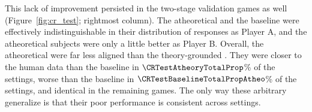 This lack of improvement persisted in the two-stage validation games as well (Figure~\ref{fig:cr_test}; rightmost column).  
The atheoretical  and the baseline were effectively indistinguishable in their distribution of responses as Player A, and the atheoretical subjects were only a little better as Player B.
Overall, the atheoretical  were far less aligned than the theory-grounded . 
They were closer to the human data than the baseline in $\CRTestAtheoryTotalProp$\% of the settings, worse than the baseline in $\CRTestBaselineTotalPropAtheo$\% of the settings, and identical in the remaining games.
The only way these arbitrary  generalize is that their poor performance is consistent across settings.
